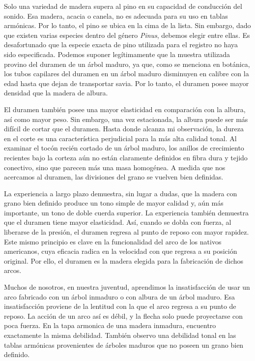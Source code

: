 \documentclass[12pt]{book}
\begin{document}
Solo una variedad de madera supera al pino en su capacidad de conducción del sonido. Esa madera, acacia o canela, no es adecuada para su uso en tablas armónicas. Por lo tanto, el pino se ubica en la cima de la lista. Sin embargo, dado que existen varias especies dentro del género \textit{Pinus}, debemos elegir entre ellas. Es desafortunado que la especie exacta de pino utilizada para el registro no haya sido especificada. Podemos suponer legítimamente que la muestra utilizada provino del duramen de un árbol maduro, ya que, como se menciona en botánica, los tubos capilares del duramen en un árbol maduro disminuyen en calibre con la edad hasta que dejan de transportar savia. Por lo tanto, el duramen posee mayor densidad que la madera de albura. 

El duramen también posee una mayor elasticidad en comparación con la albura, así como mayor peso. Sin embargo, una vez estacionada, la albura puede ser más difícil de cortar que el duramen. Hasta donde alcanza mi observación, la dureza en el corte es una característica perjudicial para la más alta calidad tonal. Al examinar el tocón recién cortado de un árbol maduro, los anillos de crecimiento recientes bajo la corteza aún no están claramente definidos en fibra dura y tejido conectivo, sino que parecen más una masa homogénea. A medida que nos acercamos al duramen, las divisiones del grano se vuelven bien definidas. 

La experiencia a largo plazo demuestra, sin lugar a dudas, que la madera con grano bien definido produce un tono simple de mayor calidad y, aún más importante, un tono de doble cuerda superior. La experiencia también demuestra que el duramen tiene mayor elasticidad. Así, cuando se dobla con fuerza, al liberarse de la presión, el duramen regresa al punto de reposo con mayor rapidez. Este mismo principio es clave en la funcionalidad del arco de los nativos americanos, cuya eficacia radica en la velocidad con que regresa a su posición original. Por ello, el duramen es la madera elegida para la fabricación de dichos arcos. 

Muchos de nosotros, en nuestra juventud, aprendimos la insatisfacción de usar un arco fabricado con un árbol inmaduro o con albura de un árbol maduro. Esa insatisfacción proviene de la lentitud con la que el arco regresa a su punto de reposo. La acción de un arco así es débil, y la flecha solo puede proyectarse con poca fuerza. En la tapa armonica de una madera inmadura, encuentro exactamente la misma debilidad. También observo una debilidad tonal en las tablas armónicas provenientes de árboles maduros que no poseen un grano bien definido.
\end{document}
